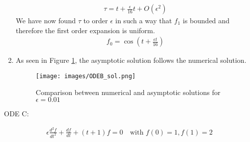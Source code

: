 \documentclass{article}
\begin{document}
\begin{enumerate}[label=\alph*.]
\begin{gather*}
        \tau = t + \frac{\epsilon}{16}t + O(\epsilon^2)
    \end{gather*}
    We have now found $\tau$ to order $\epsilon$ in such a way that $f_1$ is
    bounded and therefore the first order expansion is uniform. 
    \begin{gather*}
        f_0 = \cos\left(t + \frac{\epsilon t}{16}\right)
    \end{gather*} 
    \item As seen in Figure \ref{fig:ODEB_comp}, the asymptotic solution follows
    the numerical solution. 
        \begin{figure}
            \centering
            \texttt{[image: images/ODEB\_sol.png]}
            \caption{Comparison between numerical and asymptotic solutions for
            $\epsilon = 0.01$}
            \label{fig:ODEB_comp}
        \end{figure}

\end{enumerate}

\vspace{20pt}

ODE C: 

\begin{gather*}
    \epsilon\frac{d^2f}{dt^2} + \frac{df}{dt} + (t+1)f = 0 \quad
    \text{with } f(0) = 1, f(1) = 2
\end{gather*}
\end{document}
